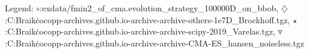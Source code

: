 Legend: {\color{NavyBlue}$\circ$}:exdata/fmin2\_of\_cma.evolution\_strategy\_100000D\_on\_bbob, {\color{Magenta}$\diamondsuit$}:C:\Users\Zeidan Braik\.cocopp\data-archives\numbbo.github.io\data-archive\data-archive\bbob{}-others-1e7D\_Brockhoff.tgz, {\color{Orange}$\star$}:C:\Users\Zeidan Braik\.cocopp\data-archives\numbbo.github.io\data-archive\data-archive\bbob{}\BFGS-scipy-2019\_Varelas.tgz, {\color{CornflowerBlue}$\triangledown$}:C:\Users\Zeidan Braik\.cocopp\data-archives\numbbo.github.io\data-archive\data-archive\bbob{}\BIPOP-CMA-ES\_hansen\_noiseless.tgz